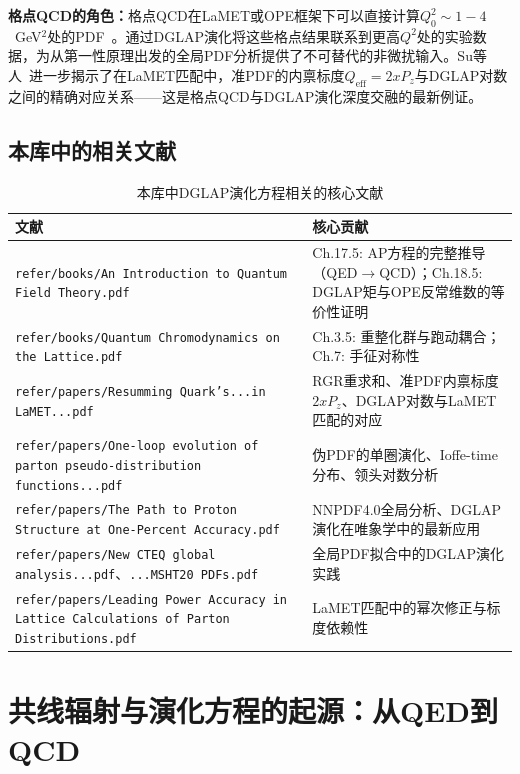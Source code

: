 \documentclass[12pt,a4paper]{ctexart}
\theoremstyle{definition}
\begin{document}
\textbf{格点QCD的角色：}格点QCD在LaMET或OPE框架下可以直接计算$Q_0^2 \sim 1-4$~GeV$^2$处的PDF~\cite{Ji2013Euclidean,Ji2014LaMET,Radyushkin2018oneLoop}。通过DGLAP演化将这些格点结果联系到更高$Q^2$处的实验数据，为从第一性原理出发的全局PDF分析提供了不可替代的非微扰输入。Su等人~\cite{Su2023RGR}进一步揭示了在LaMET匹配中，准PDF的内禀标度$Q_{\text{eff}} = 2xP_z$与DGLAP对数之间的精确对应关系——这是格点QCD与DGLAP演化深度交融的最新例证。

\subsection{本库中的相关文献}

\begin{table}[H]
\centering
\caption{本库中DGLAP演化方程相关的核心文献}
\label{tab:DGLAP_papers}
\small
\begin{tabular}{lp{7cm}}
\toprule
文献 & 核心贡献 \\
\midrule
\texttt{refer/books/An Introduction to Quantum Field Theory.pdf} & Ch.17.5: AP方程的完整推导（QED$\to$QCD）；Ch.18.5: DGLAP矩与OPE反常维数的等价性证明 \\
\texttt{refer/books/Quantum Chromodynamics on the Lattice.pdf} & Ch.3.5: 重整化群与跑动耦合；Ch.7: 手征对称性 \\
\texttt{refer/papers/Resumming Quark's...in LaMET...pdf}~\cite{Su2023RGR} &
RGR重求和、准PDF内禀标度$2xP_z$、DGLAP对数与LaMET匹配的对应 \\
\texttt{refer/papers/One-loop evolution of parton pseudo-distribution functions...pdf}~\cite{Radyushkin2018oneLoop} &
伪PDF的单圈演化、Ioffe-time分布、领头对数分析 \\
\texttt{refer/papers/The Path to Proton Structure at One-Percent Accuracy.pdf} &
NNPDF4.0全局分析、DGLAP演化在唯象学中的最新应用 \\
\texttt{refer/papers/New CTEQ global analysis...pdf}、\texttt{...MSHT20 PDFs.pdf} &
全局PDF拟合中的DGLAP演化实践 \\
\texttt{refer/papers/Leading Power Accuracy in Lattice Calculations of Parton Distributions.pdf} &
LaMET匹配中的幂次修正与标度依赖性 \\
\bottomrule
\end{tabular}
\end{table}

\section{共线辐射与演化方程的起源：从QED到QCD}
\end{document}
